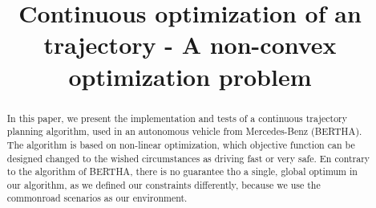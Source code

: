 \documentclass[conference]{IEEEtran}
\begin{document}


%
\title{Continuous optimization of an trajectory - A non-convex optimization problem}


\author{
}





\maketitle

\begin{abstract}
In this paper, we present the implementation and tests of a continuous trajectory planning algorithm, used in an autonomous vehicle from Mercedes-Benz (BERTHA). The algorithm is based on non-linear optimization, which objective function can be designed changed to the wished circumstances as driving fast or very safe. En contrary to the algorithm of BERTHA,  there is no guarantee tho a single, global optimum in our algorithm, as we defined our constraints differently, because we use the commonroad scenarios as our environment.
\end{abstract}





%
\IEEEpeerreviewmaketitle
\end{document}
